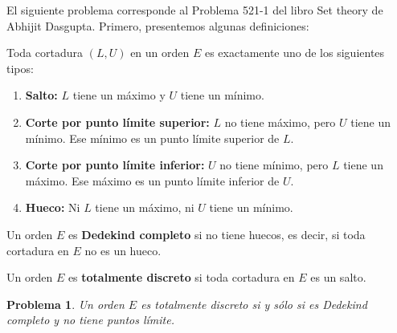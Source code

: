 \documentclass[a4,10pt]{aleph-notas}
\newtheorem*{prob}{Problema}
\begin{document}
\encabezado

\noindent
El siguiente problema corresponde al Problema 521-1 del libro Set theory de Abhijit Dasgupta. Primero, presentemos algunas definiciones:

\begin{defi}
    Toda cortadura \( (L, U) \) en un orden \( E \) es exactamente uno de los siguientes tipos:
    
    \begin{enumerate}
        \item \textbf{Salto:} \( L \) tiene un máximo y \( U \) tiene un mínimo.
        \item \textbf{Corte por punto límite superior:} \( L \) no tiene máximo, pero \( U \) tiene un mínimo. Ese mínimo es un punto límite superior de \( L \).
        \item \textbf{Corte por punto límite inferior:} \( U \) no tiene mínimo, pero \( L \) tiene un máximo. Ese máximo es un punto límite inferior de \( U \).
        \item \textbf{Hueco:} Ni \( L \) tiene un máximo, ni \( U \) tiene un mínimo.
    \end{enumerate}
\end{defi}

\begin{defi}
    Un orden \( E \) es \textbf{Dedekind completo} si no tiene huecos, es decir, si toda cortadura en \( E \) no es un hueco.
\end{defi}


\begin{defi}
    Un orden \( E \) es \textbf{totalmente discreto} si toda cortadura en \( E \) es un salto.
\end{defi}


\begin{prob}
    Un orden \( E \) es totalmente discreto si y sólo si es Dedekind completo y no tiene puntos límite.
\end{prob}
\end{document}
